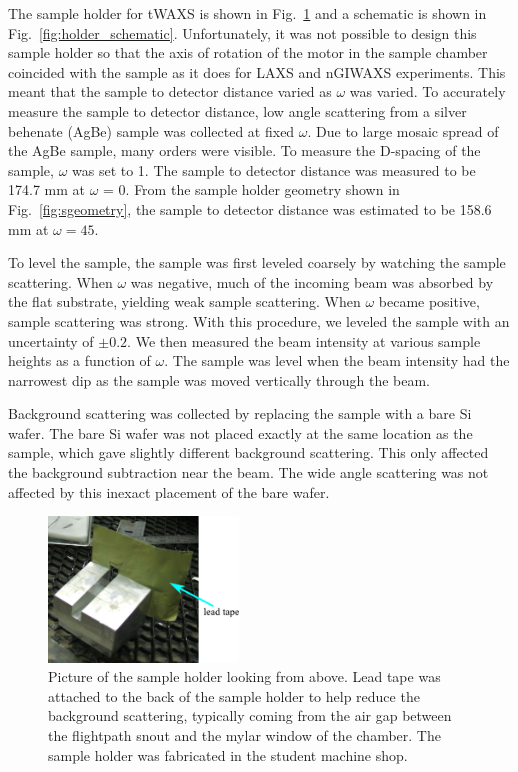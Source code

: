 The sample holder for tWAXS is shown in Fig.~\ref{fig:holder_picture} and a 
schematic is shown in Fig.~\ref{fig:holder_schematic}.  Unfortunately, it was not 
possible to design this sample holder so that the axis of rotation of the 
motor in the sample chamber coincided with the sample as it does for LAXS and 
nGIWAXS experiments.  This meant that the sample to detector distance varied 
as $\omega$ was varied. To accurately
measure the sample to detector distance, low angle scattering from a 
silver behenate (AgBe) sample was collected
at fixed $\omega$. Due to large mosaic spread of the AgBe sample, many orders were
visible. 
To measure the D-spacing of the sample, $\omega$ was set to 1\textdegree.
The sample to detector distance was measured to be 174.7 mm 
at $\omega$ = 0\textdegree.
From the sample holder geometry shown in Fig.~\ref{fig:sgeometry},
the sample to detector distance was estimated to be 
158.6 mm at $\omega=45$\textdegree.

To level the sample, 
the sample was first leveled coarsely by watching the sample scattering. When
$\omega$ was negative, much of the incoming beam was absorbed by the 
flat substrate, yielding weak sample scattering. When $\omega$ became 
positive, sample scattering was strong. With this procedure, 
we leveled the sample with an uncertainty of $\pm 0.2$\textdegree. We
then measured the beam intensity at various sample heights 
as a function of $\omega$. 
The sample was 
level when the beam intensity had the narrowest dip as the sample
was moved vertically through the beam.

Background scattering was collected by replacing the sample with a bare 
Si wafer. The bare Si wafer was not placed 
exactly at the same location
as the sample, which gave slightly different background scattering.
This only affected the background subtraction near the beam. 
The wide angle scattering was not affected by
this inexact placement of the bare wafer. 

\newpage
\begin{figure}[htbp]
  \centering
  \includegraphics[width=0.45\textwidth]{figures/ripple/MMs/transmission/sample_holder1}
  \caption[Picture of the sample holder looking from above]
  {Picture of the sample holder looking from above. 
  Lead tape was attached to the back of the sample holder to help reduce the background 
  scattering, typically coming from the air gap between the flightpath snout
  and the mylar window of the chamber. The sample holder was fabricated in the 
  student machine shop.}
  \label{fig:holder_picture}
\end{figure}


